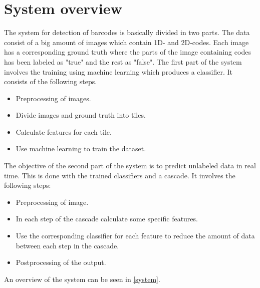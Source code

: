 \chapter{System overview}
\label{sec:System overview}
The system for detection of barcodes is basically divided in two parts. The data consist of a big amount of images which contain 1D- and 2D-codes. Each image has a corresponding ground truth where the parts of the image containing codes has been labeled as "true" and the rest as "false". The first part of the system involves the training using machine learning which produces a classifier. It consists of the following steps.

\begin{itemize}
	\item Preprocessing of images.
	\item Divide images and ground truth into tiles.
	\item Calculate features for each tile.
	\item Use machine learning to train the dataset.
\end{itemize}

The objective of the second part of the system is to predict unlabeled data in real time. This is done with the trained classifiers and a cascade. It involves the following steps:

\begin{itemize}
	\item Preprocessing of image.
	\item In each step of the cascade calculate some specific features.
	\item Use the corresponding classifier for each feature to reduce the amount of data between each step in the cascade.
	\item Postprocessing of the output.
\end{itemize}
An overview of the system can be seen in \ref{system}.

